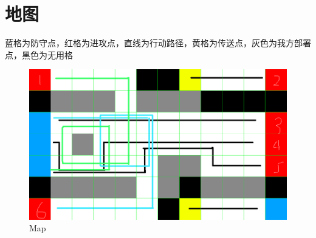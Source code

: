 \documentclass[a4paper,12pt]{article}
\begin{document}
	\section{地图}
		蓝格为防守点，红格为进攻点，直线为行动路径，黄格为传送点，灰色为我方部署点，黑色为无用格
		\begin{figure}[p]
			\centering
			\includegraphics[width=1\textwidth]{map1}
			\caption{Map}
		\end{figure}
\end{document}
